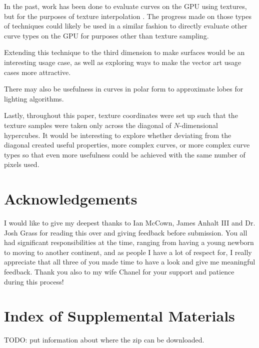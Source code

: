\documentclass{jcgt}
\begin{document}
In the past, work has been done to evaluate curves on the GPU using textures, but for the purposes of texture interpolation \cite{doi:10.1080/2151237X.2008.10129269}.  The progress made on those types of techniques could likely be used in a similar fashion to directly evaluate other curve types on the GPU for purposes other than texture sampling.

Extending this technique to the third dimension to make surfaces would be an interesting usage case, as well as exploring ways to make the vector art usage cases more attractive.

There may also be usefulness in curves in polar form to approximate lobes for lighting algorithms.

Lastly, throughout this paper, texture coordinates were set up such that the texture samples were taken only across the diagonal of $N$-dimensional hypercubes.  It would be interesting to explore whether deviating from the diagonal created useful properties, more complex curves, or more complex curve types so that even more usefulness could be achieved with the same number of pixels used.

\section*{Acknowledgements}
\label{sec:acknowledgements}
I would like to give my deepest thanks to Ian McCown, James Anhalt III and Dr. Josh Grass for reading this over and giving feedback before submission.  You all had significant responsibilities at the time, ranging from having a young newborn to moving to another continent, and as people I have a lot of respect for, I really appreciate that all three of you made time to have a look and give me meaningful feedback.  Thank you also to my wife Chanel for your support and patience during this process!

\small



\section*{Index of Supplemental Materials}
\label{sec:indexofsupplementalmaterials}
TODO: put information about where the zip can be downloaded.
\end{document}
